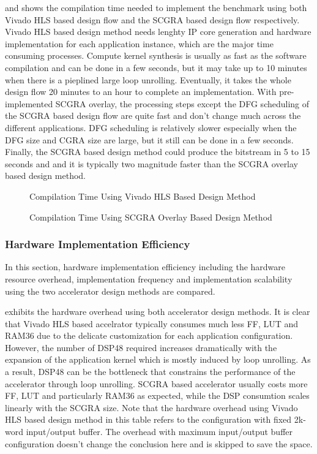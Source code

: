  and  shows the compilation time needed to implement the benchmark using both Vivado HLS based design flow and the SCGRA based design flow respectively. Vivado HLS based design method needs lenghty IP core generation and hardware implementation for each application instance, which are the major time consuming processes. Compute kernel synthesis is usually as fast as the software compilation and can be done in a few seconds, but it may take up to 10 minutes when there is a pieplined large loop unrolling. Eventually, it takes the whole design flow 20 minutes to an hour to complete an implementation. With pre-implemented SCGRA overlay, the processing steps except the DFG scheduling of the SCGRA based design flow are quite fast and don't change much across the different applications. DFG scheduling is relatively slower especially when the DFG size and CGRA size are large, but it still can be done in a few seconds. Finally, the SCGRA based design method could produce the bitstream in 5 to 15 seconds and and it is typically two magnitude faster than the SCGRA overlay based design method. 

\begin{figure}[H]
\caption{Compilation Time Using Vivado HLS Based Design Method}
\label{fig:Vivado-HLS-Compilation-Time}
\end{figure}

\begin{figure}[H]
\caption{Compilation Time Using SCGRA Overlay Based Design Method}
\label{fig:SCGRA-Overlay-Compilation-Time}
\end{figure}

\subsubsection{Hardware Implementation Efficiency}
In this section, hardware implementation efficiency including the hardware resource overhead, implementation frequency and implementation scalability using the two accelerator design methods are compared. 

 exhibits the hardware overhead using both accelerator design methods. It is clear that Vivado HLS based accelrator typically consumes much less FF, LUT and RAM36 due to the delicate customization for each application configuration. However, the number of DSP48 required increases dramatically with the expansion of the application kernel which is mostly induced by loop unrolling. As a result, DSP48 can be the bottleneck that constrains the performance of the accelerator through loop unrolling. SCGRA based accelerator usually costs more FF, LUT and particularly RAM36 as expected, while the DSP consumtion scales linearly with the SCGRA size. Note that the hardware overhead using Vivado HLS based design method in this table refers to the configuration with fixed 2k-word input/output buffer. The overhead with maximum input/output buffer configuration doesn't change the conclusion here and is skipped to save the space. 

